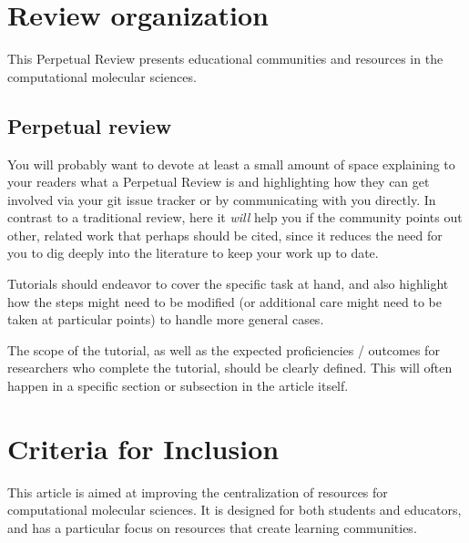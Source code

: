 \documentclass[9pt,review]{livecoms}
\begin{document}
\section{Review organization}

This Perpetual Review presents educational communities and resources in the computational molecular sciences.

\subsection{Perpetual review}

You will probably want to devote at least a small amount of space explaining to your readers what a Perpetual Review is and highlighting how they can get involved via your git issue tracker or by communicating with you directly.
In contrast to a traditional review, here it \emph{will} help you if the community points out other, related work that perhaps should be cited, since it reduces the need for you to dig deeply into the literature to keep your work up to date.

Tutorials should endeavor to cover the specific task at hand, and also highlight how the steps might need to be modified (or additional care might need to be taken at particular points) to handle more general cases.

The scope of the tutorial, as well as the expected proficiencies / outcomes for researchers who complete the tutorial, should be clearly defined.
This will often happen in a specific section or subsection in the article itself.

\section{Criteria for Inclusion}


This article is aimed at improving the centralization of resources for computational molecular sciences. It is designed for both students and educators, and has a particular focus on resources that create learning communities. 
\end{document}
